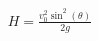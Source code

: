 \documentclass[preview]{standalone}
\begin{document}
\begin{align*}
H = \frac{v_0^2 \sin^2(\theta)}{2g}
\end{align*}
\end{document}
